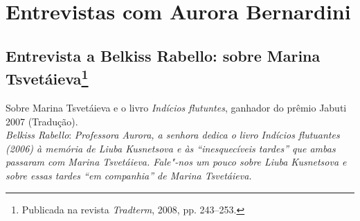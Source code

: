 \part{Entrevistas com Aurora Bernardini}

\chapter{Entrevista a Belkiss Rabello: sobre Marina Tsvetáieva\footnote{Publicada na revista
  \emph{Tradterm}, 2008, pp. 243--253.}}

Sobre Marina Tsvetáieva e o livro \emph{Indícios flutuntes}, ganhador do
prêmio Jabuti 2007 (Tradução). \\

\noindent
\emph{Belkiss Rabello}: \emph{Professora Aurora, a senhora dedica o
livro \emph{Indícios flutuantes} (2006) à memória de Liuba Kusnetsova e
às ``inesquecíveis tardes'' que ambas passaram com Marina Tsvetáieva.
Fale"-nos um pouco sobre Liuba Kusnetsova e sobre essas tardes ``em
companhia'' de Marina Tsvetáieva.}

